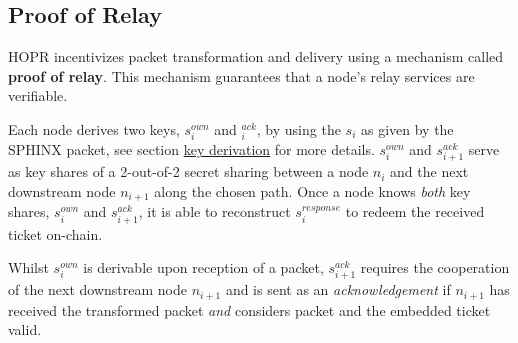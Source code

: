 \subsection{Proof of Relay}
\label{sec:proofofrelay}

HOPR incentivizes packet transformation and delivery using a mechanism called \textbf{proof of relay}. This mechanism guarantees that a node's relay services are verifiable.

Each node derives two keys, $s_i^{own}$ and $_i^{ack}$, by using the $s_i$ as given by the SPHINX packet, see section \href{sec:keyderivation}{key derivation} for more details. $s_i^{own}$ and $s_{i+1}^{ack}$ serve as key shares of a 2-out-of-2 secret sharing between a node $n_i$ and the next downstream node $n_{i+1}$ along the chosen path. Once a node knows \textit{both} key shares, $s_i^{own}$ and $s_{i+1}^{ack}$, it is able to reconstruct $s_i^{response}$ to redeem the received ticket on-chain.

Whilst $s_i^{own}$ is derivable upon reception of a packet, $s_{i+1}^{ack}$ requires the cooperation of the next downstream node $n_{i+1}$ and is sent as an \textit{acknowledgement} if $n_{i+1}$ has received the transformed packet \textit{and} considers packet and the embedded ticket valid.

